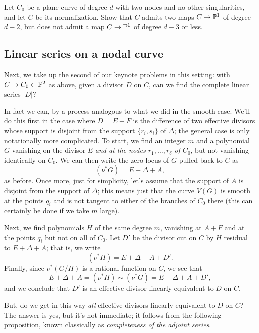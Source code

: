 \begin{exercise}
Let $C_0$ be a plane curve of degree $d$ with two nodes and no other singularities, and let $C$ be its normalization. Show that $C$ admits two maps $C \to {\mathbb P}^1$ of degree $d-2$, but does not admit a map $C \to {\mathbb P}^1$ of degree $d-3$ or less.
\end{exercise}


\subsection{Linear series on a nodal curve}

Next, we take up the second of our keynote problems in this setting: with $C \to C_0 \subset {\mathbb P}^2$ as above, given a divisor $D$ on $C$, can we find the complete linear series $|D|$?

In fact we can, by a process analogous to what we did in the smooth case. We'll do this first in the case where $D = E-F$ is the difference of two effective divisors whose support is disjoint from the support $\{r_i, s_i\}$ of $\Delta$; the general case is only notationally more complicated. To start, we find an integer $m$ and a polynomial $G$ vanishing on the divisor $E$ \emph{and at the nodes $r_1,\dots,r_\delta$ of $C_0$}, but not vanishing identically on $C_0$. We can then write the zero locus of $G$ pulled back to $C$ as
$$
(\nu^*G) = E + \Delta + A,
$$
as before. Once more, just for simplicity, let's assume that the support of $A$ is disjoint from the support of $\Delta$; this means just that the curve $V(G)$ is smooth at the points $q_i$ and is not tangent to either of the branches of $C_0$ there (this can certainly be done if we take $m$ large).

Next, we find polynomials $H$ of the same degree $m$, vanishing at $A+F$ and at the points $q_i$  but not on all of $C_0$. Let $D'$ be the divisor cut on $C$ by $H$ residual to $E + \Delta + A$; that is, we write
$$
(\nu^*H) = E + \Delta + A + D'.
$$
Finally, since $\nu^*(G/H)$ is a rational function on $C$, we see that 
$$
E + \Delta + A = (\nu^*H) \sim (\nu^*G) = E + \Delta + A + D',
$$
and we conclude that $D'$ is an effective divisor linearly equivalent to $D$ on $C$.

But, do we get in this way \emph{all} effective divisors linearly equivalent to $D$ on $C$? The answer is yes, but it's not immediate; it follows from the following proposition, known classically as \emph{completeness of the adjoint series}.

